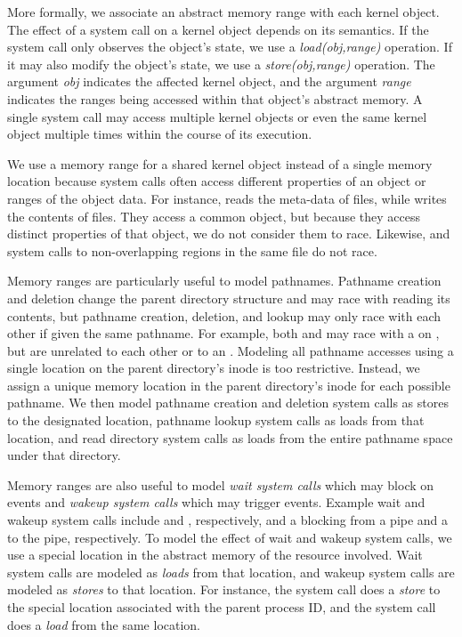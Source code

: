 More formally, we associate an abstract memory range with each kernel
object.  The effect of a system call on a kernel object depends on
its semantics. If the system call only observes the object's state, we
use a \emph{load(obj,range)} operation. If it may also modify the
object's state, we use a \emph{store(obj,range)} operation.  The
argument \emph{obj} indicates the affected kernel object, and the
argument \emph{range} indicates the ranges being accessed within that
object's abstract memory. A single system call may access multiple
kernel objects or even the same kernel object multiple times within
the course of its execution. 

We use a memory range for a shared kernel object instead of a single
memory location because system calls often access different
properties of an object or ranges of the object data.
For instance,  reads the
meta-data of files, while  writes the contents of files.
They access a common object, but because they access distinct
properties of that object, we do not consider them to race.  Likewise, 
 and  system calls to non-overlapping regions in
the same file do not race.

Memory ranges are particularly useful to model pathnames. 
Pathname creation and deletion change the parent directory structure
and may race with reading its contents, but pathname
creation, deletion, and lookup may only race with each other if given
the same pathname.  For example, both  and
 may race with a  on ,
but are unrelated to each other or to an . 
Modeling all pathname accesses using a single location on the parent
directory's inode is too restrictive.  Instead, we assign a unique
memory location in the parent directory's inode for each possible
pathname.  We then model pathname creation and deletion system calls 
as stores to the designated location, pathname lookup system calls as
loads from that location, and read directory system calls as loads
from the entire pathname space under that directory.

Memory ranges are also useful to model \emph{wait system calls} which
may block on events and \emph{wakeup system calls} which may trigger
events.  Example wait and wakeup system calls include  and
, respectively, and a blocking  from a pipe and a
 to the pipe, respectively.
To model the effect of wait and wakeup system calls, we use a special
location in the abstract memory of the resource involved.  Wait system
calls are modeled as \emph{loads} from that location, and wakeup system
calls are modeled as \emph{stores} to that location.  For instance, the
 system call does a \emph{store} to the special location
associated with the parent process ID, and the  system
call does a \emph{load} from the same location.

